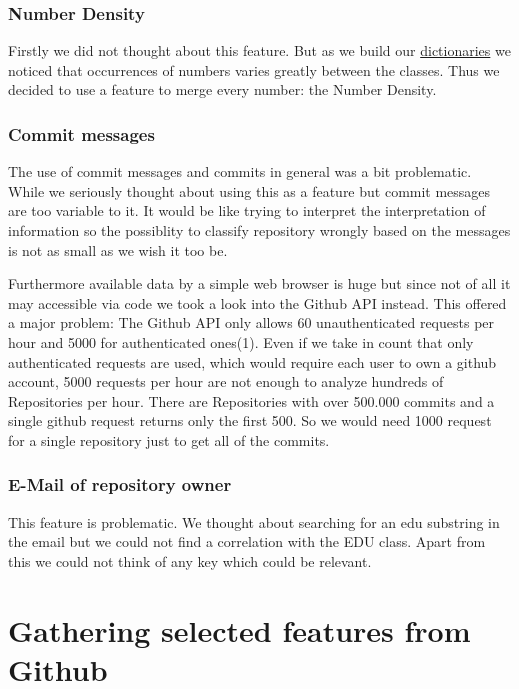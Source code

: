 \documentclass[paper=A4,pagesize=auto,12pt,headinclude=true,footinclude=true,BCOR=0mm,DIV=calc]{scrartcl}
\begin{document}
	\subsubsection{Number Density}
	Firstly we did not thought about this feature. But as we build our \hyperref[sec: dictionary]{dictionaries} we noticed that occurrences of numbers varies greatly between the classes. Thus we decided to use a feature to merge every number: the Number Density.
	
	\subsubsection{Commit messages}
	The use of commit messages and commits in general was a bit problematic. While we seriously thought about using this as a feature but commit messages are too variable to it. It would be like trying to interpret the interpretation of information so the possiblity to classify repository wrongly based on the messages is not as small as we wish it too be.
	
	
	Furthermore available data by a simple web browser is huge but since not of all it may accessible via code we took a look into the Github API instead. This offered a major problem: The Github API only allows 60 unauthenticated requests per hour and 5000 for authenticated ones(1). Even if we take in count that only authenticated requests are used, which would require each user to own a github account, 5000 requests per hour are not enough to analyze hundreds of Repositories per hour. There are  Repositories with over 500.000 commits and a single github request returns only the first 500. So we would need 1000 request for a single repository just to get all of the commits.
	
	\subsubsection{E-Mail of repository owner}
	This feature is problematic. We thought about searching for an edu substring in the email but we could not find a correlation with the EDU class. Apart from this we could not think of any key which could be relevant.

	
	
	
	
	\section{Gathering selected features from Github}
	
\end{document}
